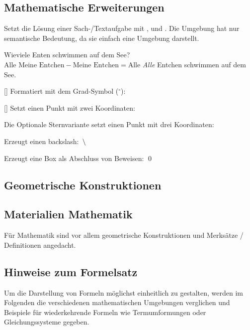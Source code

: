 \subsection{Mathematische Erweiterungen}\label{sec:allgemeinmathe}
\begin{environments}
	Setzt die Lösung einer Sach-/Textaufgabe mit ,  und . Die Umgebung hat nur semantische Bedeutung, da sie einfach eine  Umgebung darstellt.
	
	\begin{example}
		\begin{sachaufgabe}
			\frage Wieviele Enten schwimmen auf dem See?
			\rechnung $\text{Alle Meine Entchen} - \text{Meine Entchen} = \text{Alle}$
			\antwort \emph{Alle} Entchen schwimmen auf dem See.
		\end{sachaufgabe}
	\end{example}
\end{environments}
\begin{commands}
	[] Formatiert  mit dem Grad-Symbol ($^\circ$): 
	
	[\sarg{}] Setzt einen Punkt mit zwei Koordinaten: 
	
	Die Optionale Sternvariante setzt einen Punkt mit drei Koordinaten: 
	
	 Erzeugt einen backslash: $\,\backslash\,$
	
	 Erzeugt eine Box als Abschluss von Beweisen: \qed
\end{commands}

\subsection{Geometrische Konstruktionen}\label{sec:geometrie}

\subsection{Materialien Mathematik}\label{sec:materialmathe}
Für Mathematik sind vor allem geometrische Konstruktionen und Merksätze / Definitionen angedacht.

\subsection{Hinweise zum Formelsatz}\label{sec:formelsatz}
Um die Darstellung von Formeln möglichst einheitlich zu gestalten, werden im Folgenden die verschiedenen mathematischen Umgebungen verglichen und Beispiele für wiederkehrende Formeln wie Termumformungen oder Gleichungssysteme gegeben.

